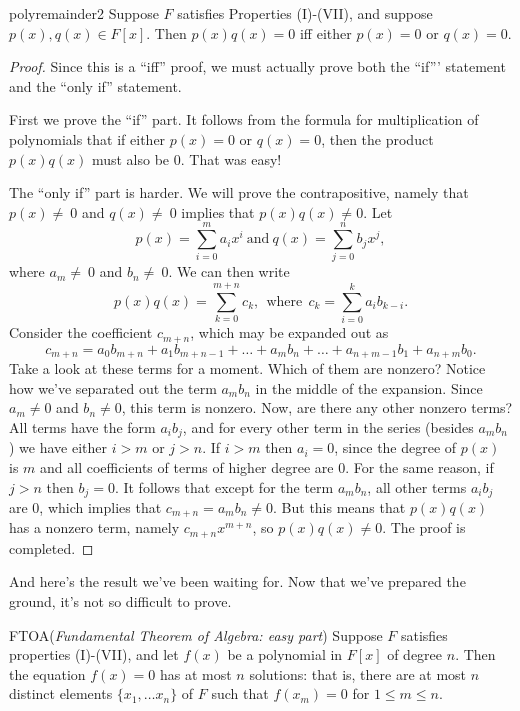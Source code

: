 \begin{prop}{polyremainder2}
Suppose $F$ satisfies Properties (I)-(VII), and suppose $p(x),  q(x) \in F[x]$. Then $p(x)  q(x)=0$ iff either $p(x)=0$ or $q(x)=0$.
\end {prop}
\begin{proof}
Since this is a ``iff'' proof, we must actually prove both the ``if''' statement and the ``only if'' statement.  

First we prove the ``if'' part.  It follows from  the formula for multiplication of polynomials that if either $p(x)=0$ or $q(x)=0$, then the product $p(x)q(x)$ must also be 0. That was easy!

The ``only if'' part is harder. We will prove the contrapositive, namely that  $p(x)\neq\ 0$ and  $ q(x)\neq\ 0$ implies that  $p(x)q(x) \neq 0$.
Let 
\[p(x) =  \sum_{i=0}^{m} a_i x^i \mathrm{~ and ~} q(x) =  \sum_{j=0}^{n} b_j x^j, \] 
where $a_m \neq\ 0$ and $b_n\neq\ 0$.
We can then write
 \[p(x) q(x) = \sum_{k=0}^{m+n} c_k, \mathrm{~~where~~} c_{k} =  \sum_{i=0}^{k}a_i b_{k-i}.\]
Consider the coefficient $c_{m+n}$, which may be expanded out as
\[
c_{m+n} =  a_0 b_{m+n} + a_1 b_{m+n-1} + \ldots  + a_{m}b_{n} + \dots +  a_{n+m-1}b_{1} + a_{n+m}b_{0}.
\]
Take a look at these terms for a moment. Which of them are nonzero?  Notice how we've separated out the term $a_{m}b_{n}$ in the middle of the expansion. Since $a_{m} \neq 0$ and $b_{n} \neq 0$, this term is nonzero. Now, are there
any other nonzero terms?  All terms have the  form $a_i b_j$, and for every other term in the series (besides $a_{m}b_{n}$) we have either $i>m$ or $j>n$.  If $i>m$ then $a_i=0$, since the degree of $p(x)$ is $m$ and all coefficients of terms of higher degree are 0.  For the same reason, if $j>n$ then $b_j=0$. It follows that except for the term $a_{m}b_{n}$, all other terms $a_ib_j$ are 0, which implies that $c_{m+n} = a_mb_n \neq 0$. But this means that $p(x)q(x)$ has a nonzero term, namely
$c_{m+n}x^{m+n}$, so $p(x)q(x) \neq 0$.    The proof is completed.
\end{proof}

And here's the result we've been waiting for. Now that we've prepared the ground, it's not so difficult to prove.

\begin{prop}{FTOA}(\emph{Fundamental Theorem of Algebra: easy part})
Suppose $F$ satisfies properties (I)-(VII), and let $f(x)$ be a polynomial in $F[x]$ of degree $n$. Then the equation $f(x)=0$ has at most $n$ solutions: that is, there are at most $n$ distinct elements $\{x_1,\ldots x_n\}$ of $F$ such that $f(x_m)=0$ for $1 \le m \le n$.
\end {prop}


